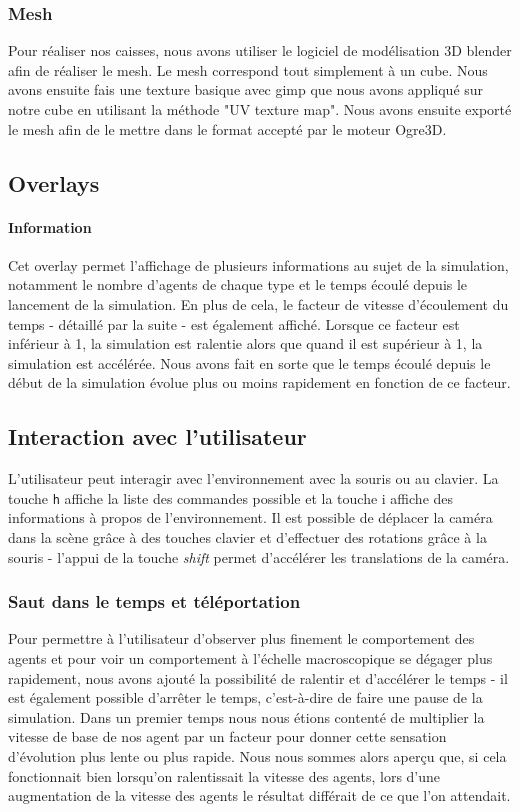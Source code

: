 \subsubsection{Mesh}
Pour réaliser nos caisses, nous avons utiliser le logiciel de modélisation 3D
blender afin de réaliser le mesh. Le mesh correspond tout simplement à un
cube. Nous avons ensuite fais une texture basique avec gimp que nous avons
appliqué sur notre cube en utilisant la méthode "UV texture map".
Nous avons ensuite exporté le mesh afin de le mettre dans le format
accepté par le moteur Ogre3D.


\subsection{Overlays}

\paragraph{Information}
Cet overlay permet l'affichage de plusieurs informations au sujet de la
simulation, notamment le nombre d'agents de chaque type et le temps écoulé
depuis le lancement de la simulation.
En plus de cela, le facteur de vitesse d'écoulement du temps - détaillé par la
suite - est également affiché. Lorsque ce facteur est inférieur à 1, la
simulation est ralentie alors que quand il est supérieur à 1, la simulation
est accélérée. Nous avons fait en sorte que le temps écoulé depuis le début de
la simulation évolue plus ou moins rapidement en fonction de ce facteur.

\subsection{Interaction avec l'utilisateur}

L'utilisateur peut interagir avec l'environnement avec la souris ou au
clavier. La touche \verb!h! affiche la liste des commandes possible et la
touche i affiche des informations à propos de l'environnement.
Il est possible de déplacer la caméra dans la scène grâce à des touches
clavier et d'effectuer des rotations grâce à la souris - l'appui de la touche
\emph{shift} permet d'accélérer les translations de la caméra.

\subsubsection{Saut dans le temps et téléportation}
Pour permettre à l'utilisateur d'observer plus finement le comportement des
agents et pour voir un comportement à l'échelle macroscopique se dégager plus
rapidement, nous avons ajouté la possibilité de ralentir et d'accélérer le
temps - il est également possible d'arrêter le temps, c'est-à-dire de faire
une pause de la simulation. Dans un premier temps nous nous étions contenté de
multiplier la vitesse de base de nos agent par un facteur pour donner cette
sensation d'évolution plus lente ou plus rapide. Nous nous sommes alors aperçu
que, si cela fonctionnait bien lorsqu'on ralentissait la vitesse des agents,
lors d'une augmentation de la vitesse des agents le résultat différait de ce
que l'on attendait.


